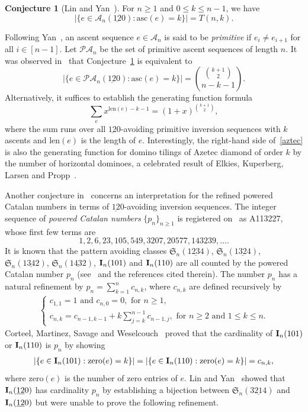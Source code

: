 \documentclass[12pt,A4]{amsart}
\numberwithin{equation}{section}
\theoremstyle{plain}
\theoremstyle{definition}
\newtheorem{conjecture}[theorem]{Conjecture}
\def\S{\mathfrak{S}}
\def\A{\mathcal{A}}
\def\PA{\mathcal{PA}}
\def\zero{\mathrm{zero}}
\def\len{\mathrm{len}}
\def\asc{\mathrm{asc}}
\def\I{\operatorname{{\bf I}}}
\begin{document}
\begin{conjecture}[Lin and Yan~]\label{asc:12-0}
For $n\geq1$ and $0\leq k\leq n-1$, we have
$$
|\{e\in\A_n(\underline{12}0):\asc(e)=k\}|=T(n,k).
$$




\end{conjecture}

Following Yan~\cite{yan0}, an ascent sequence $e\in\A_n$ is said to be {\em primitive} if $e_i\neq e_{i+1}$ for all $i\in[n-1]$. Let $\PA_n$ be the set of primitive ascent sequences of length $n$. It was observed in~\cite{ly} that Conjecture~\ref{asc:12-0} is equivalent to 
\begin{equation}\label{PA:12-0}
|\{e\in\PA_n(\underline{12}0):\asc(e)=k\}|=\binom{\binom{k+1}{2}}{n-k-1}.
\end{equation}
Alternatively, it suffices to establish the generating function formula
\begin{equation}\label{aztec}
\sum_{e}x^{\len(e)-k-1}=(1+x)^{{k+1\choose2}}, 
\end{equation}
where the sum runs over all $\underline{12}0$-avoiding primitive inversion sequences with $k$ ascents and $\len(e)$ is the length of $e$. Interestingly,  the right-hand side of~\eqref{aztec} is also the generating function for domino tilings of Azetec diamond of order $k$ by the number of  horizontal dominoes, a celebrated  result of Elkies, Kuperberg, Larsen and Propp~\cite{eklp}.

Another conjecture in~\cite{ly} concerns an interpretation for the refined powered Catalan numbers in terms of $\underline{12}0$-avoiding inversion sequences.
The integer sequence of {\em powered Catalan numbers} $\{p_n\}_{n\geq1}$ is registered on~\cite{oeis} as A113227, whose first few terms are
$$
1,2,6,23,105,549,3207,20577,143239,\ldots.
$$
It is known that the pattern avoiding classes
$\S_n(1\underline{23}4)$, $\S_n(1\underline{32}4)$, $\S_n(1\underline{34}2)$, $\S_n(1\underline{43}2)$, $\I_n(101)$ and $\I_n(110)$ are all counted by the powered  Catalan number $p_n$ (see~\cite{bbgr,cor,ms} and the references cited therein).
The number $p_n$ has a natural refinement by $p_n=\sum_{k=1}^n c_{n,k}$, where $c_{n,k}$ are defined recursively by
\begin{align}\label{recurrence}
\begin{cases}
c_{1,1}=1\text{ and }c_{n,0}=0, \text{ for } n\ge 1,\\
c_{n,k}=c_{n-1,k-1}+k\sum_{j=k}^{n-1}c_{n-1,j}, \text{ for $n\geq2$ and $1\leq k\leq n$}.
\end{cases}
\end{align}
Corteel, Martinez,  Savage and  Weselcouch~\cite{cor} proved that the cardinality of $\I_n(101)$ or $\I_n(110)$ is $p_n$ by showing
\begin{align}\label{101=110 with zero}
|\{e\in\I_n(101):\zero(e)=k\}|=|\{e\in\I_n(110):\zero(e)=k\}|=c_{n,k},
\end{align}
where $\zero(e)$ is the number of zero entries of $e$. Lin and Yan~\cite{ly} showed that $\I_n(\underline{12}0)$ has cardinality $p_n$ by establishing a bijection between $\S_n(3\underline{21}4)$ and $\I_n(\underline{12}0)$ but were unable to prove the following refinement. 
\end{document}
